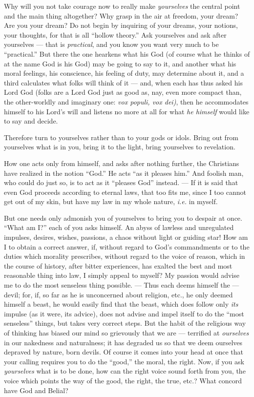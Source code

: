 Why will you not take courage now to really make \textit{yourselves} the 
central point and the main thing altogether? Why grasp in the air at freedom, 
your dream? Are you your dream? Do not begin by inquiring of your dreams, your 
notions, your thoughts, for that is all ``hollow theory.'' Ask yourselves 
and ask after yourselves --- that is \textit{practical}, and you know you want 
very much to be ``practical.'' But there the one hearkens what his God (of 
course what he thinks of at the name God is his God) may be going to say to 
it, and another what his moral feelings, his conscience, his feeling of duty, 
may determine about it, and a third calculates what folks will think of it --- 
and, when each has thus asked his Lord God (folks are a Lord God just as good 
as, nay, even more compact than, the other-worldly and imaginary one: 
\textit{vox populi, vox dei)}, then he accommodates himself to his Lord's will 
and listens no more at all for what \textit{he himself} would like to say and 
decide.

Therefore turn to yourselves rather than to your gods or idols. Bring out from 
yourselves what is in you, bring it to the light, bring yourselves to 
revelation.

How one acts only from himself, and asks after nothing further, the Christians 
have realized in the notion ``God.'' He acts ``as it pleases him.'' And 
foolish man, who could do just so, is to act as it ``pleases God'' instead. --- If it is said that even God proceeds according to eternal laws, that too 
fits me, since I too cannot get out of my skin, but have my law in my whole 
nature, \textit{i.e.} in myself.

But one needs only admonish you of yourselves to bring you to despair at once. 
``What am I?'' each of you asks himself. An abyss of lawless and unregulated 
impulses, desires, wishes, passions, a chaos without light or guiding star! 
How am I to obtain a correct answer, if, without regard to God's commandments 
or to the duties which morality prescribes, without regard to the voice of 
reason, which in the course of history, after bitter experiences, has exalted 
the best and most reasonable thing into law, I simply appeal to myself? My 
passion would advise me to do the most senseless thing possible. --- Thus each 
deems himself the --- devil; for, if, so far as he is unconcerned about 
religion, etc., he only deemed himself a beast, he would easily find that the 
beast, which does follow only \textit{its} impulse (as it were, its advice), 
does not advise and impel itself to do the ``most senseless'' things, but 
takes very correct steps. But the habit of the religious way of thinking has 
biased our mind so grievously that we are --- terrified at \textit{ourselves} 
in our nakedness and naturalness; it has degraded us so that we deem ourselves 
depraved by nature, born devils. Of course it comes into your head at once 
that your calling requires you to do the ``good,'' the moral, the right. 
Now, if you ask \textit{yourselves} what is to be done, how can the right 
voice sound forth from you, the voice which points the way of the good, the 
right, the true, etc.? What concord have God and Belial?

